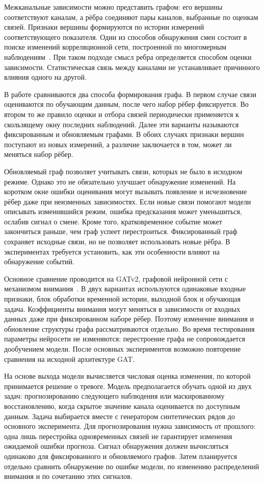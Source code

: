 \documentclass[bachelor, och, diploma]{SCWorks}
\begin{document}
Межканальные зависимости можно представить графом: его вершины соответствуют каналам, а рёбра соединяют пары каналов, выбранные по оценкам связей. Признаки вершины формируются по истории измерений соответствующего показателя. Один из способов обнаружения смен состоит в поиске изменений корреляционной сети, построенной по многомерным наблюдениям~\cite{barnett2016correlation}. При таком подходе смысл ребра определяется способом оценки зависимости. Статистическая связь между каналами не устанавливает причинного влияния одного на другой.

В работе сравниваются два способа формирования графа. В первом случае связи оцениваются по обучающим данным, после чего набор рёбер фиксируется. Во втором то же правило оценки и отбора связей периодически применяется к скользящему окну последних наблюдений. Далее эти варианты называются фиксированным и обновляемым графами. В обоих случаях признаки вершин поступают из новых измерений, а различие заключается в том, может ли меняться набор рёбер.

Обновляемый граф позволяет учитывать связи, которых не было в исходном режиме. Однако это не обязательно улучшает обнаружение изменений. На коротком окне ошибки оценивания могут вызывать появление и исчезновение рёбер даже при неизменных зависимостях. Если новые связи помогают модели описывать изменившийся режим, ошибка предсказания может уменьшиться, ослабив сигнал о смене. Кроме того, кратковременное событие может закончиться раньше, чем граф успеет перестроиться. Фиксированный граф сохраняет исходные связи, но не позволяет использовать новые рёбра. В экспериментах требуется установить, как эти особенности влияют на обнаружение событий.

Основное сравнение проводится на GATv2, графовой нейронной сети с механизмом внимания~\cite{brody2022attentive}. В двух вариантах используются одинаковые входные признаки, блок обработки временной истории, выходной блок и обучающая задача. Коэффициенты внимания могут меняться в зависимости от входных данных даже при фиксированном наборе рёбер. Поэтому изменение внимания и обновление структуры графа рассматриваются отдельно. Во время тестирования параметры нейросети не изменяются: перестроение графа не сопровождается дообучением модели. После основных экспериментов возможно повторение сравнения на исходной архитектуре GAT.

На основе выхода модели вычисляется числовая оценка изменения, по которой принимается решение о тревоге. Модель предполагается обучать одной из двух задач: прогнозированию следующего наблюдения или маскированному восстановлению, когда скрытое значение канала оценивается по доступным данным. Задача выбирается вместе с генератором синтетических рядов до основного эксперимента. Для прогнозирования нужна зависимость от прошлого: одна лишь перестройка одновременных связей не гарантирует изменения ожидаемой ошибки прогноза. Сигнал обнаружения должен вычисляться одинаково для фиксированного и обновляемого графов. Затем планируется отдельно сравнить обнаружение по ошибке модели, по изменению распределений внимания и по сочетанию этих сигналов.
\end{document}
